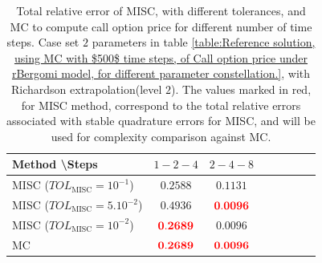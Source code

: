 \begin{table}[!h]
	\centering
	\begin{tabular}{l*{6}{c}r}
		Method \textbackslash  Steps            & $1-2-4$ & $2-4-8$  \\
		\hline
		MISC ($TOL_{\text{MISC}}=10^{-1}$)  & $\mathbf{ 0.2588
		}$ & $\mathbf{ 0.1131}$ \\
		MISC ($TOL_{\text{MISC}}=5.10^{-2}$)  & $\mathbf{   0.4936
		}$ & $\mathbf{{\color{red} 0.0096} }$  \\
		MISC ($TOL_{\text{MISC}}=10^{-2}$)  & $\mathbf{ {\color{red}0.2689}}$ & $\mathbf{ 0.0096 }$    \\	
		\hline
		MC   & $\mathbf{{\color{red}0.2689}}$  & $\mathbf{{\color{red} 0.0096}}$    \\
		\hline
	\end{tabular}
	\caption{Total relative  error of MISC, with different tolerances, and MC to compute call option price   for different number of time steps. Case set $2$ parameters in table \ref{table:Reference solution, using MC with $500$ time steps, of Call option price under rBergomi model, for different parameter constellation.}, with Richardson extrapolation(level $2$). The values marked in red, for MISC method, correspond to the total relative errors associated with  stable quadrature errors for MISC, and will be used for complexity comparison against MC.}
	\label{Total  error of MISC and MC to compute Call option price of the different tolerances for different number of time steps. Case set $2$ parameters, with Richardson extrapolation(level $2$). The numbers between parentheses are the corresponding absolute errors,linear}
\end{table}

